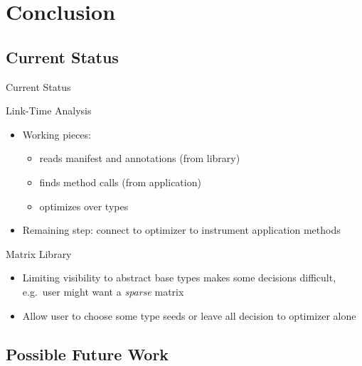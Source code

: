 \documentclass{beamer}
\begin{document}
\section{Conclusion}

\subsection{Current Status}

\begin{frame}{Current Status}
  \begin{block}{Link-Time Analysis}
    \begin{itemize}
    \item Working pieces:
      \begin{itemize}
      \item reads manifest and annotations (from library)
      \item finds method calls (from application)
      \item optimizes over types
      \end{itemize}
    \item Remaining step: connect to optimizer to instrument application methods
    \end{itemize}
  \end{block}
\pause
  \begin{block}{Matrix Library}
    \begin{itemize}
    \item Limiting visibility to abstract base types makes some decisions difficult, e.g.\ user might want a {\it sparse} matrix
    \item Allow user to choose some type seeds or leave all decision to optimizer alone
    \end{itemize}
  \end{block}
\end{frame}

\subsection{Possible Future Work}
\end{document}

